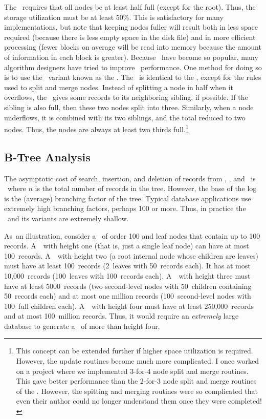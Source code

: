 The \BPtree\ requires that all nodes be at least half full
(except for the root).
Thus, the storage utilization must be at least 50\%.
This is satisfactory for many implementations, but note that keeping
nodes fuller will result both in
less space required (because there is less empty space in the disk file)
and in more efficient processing (fewer blocks on average will be read
into memory because the amount of information in each block is greater).
Because \Btrees\ have become so popular, many algorithm designers have
tried to improve \Btree\ performance.
One method for doing so is to use the \BPtree\ variant known as the
\BStree.
The \BStree\ is identical to the \BPtree, except for the rules used
to split and merge nodes.
Instead of splitting a node in half when it overflows, the \BStree\
gives some records to its neighboring sibling, if possible.
If the sibling is also full, then these two nodes split into three.
Similarly, when a node underflows, it is combined with its two
siblings, and the total reduced to two nodes.
Thus, the nodes are always at least two thirds full.\footnote{
This concept can be extended further if higher space utilization is
required.
However, the update routines become much more complicated.
I once worked on a project where we implemented 3-for-4 node split
and merge routines.
This gave better performance than the 2-for-3 node split and merge
routines of the \BStree.
However, the spitting and merging routines were so complicated that
even their author could no longer understand them
once they were completed!}

\subsection{B-Tree Analysis}

The asymptotic cost of search, insertion, and deletion of
records from \Btrees, \BPtrees, and \BStrees\ is \Thetalogn\
where \(n\) is the total number of records in the tree.
However, the base of the log is the (average) branching factor of the
tree.
Typical database applications use extremely high branching factors,
perhaps 100 or more.
Thus, in practice the \Btree\ and its variants are extremely shallow.

As~an illustration, consider a \BPtree\ of order 100 and leaf
nodes that contain up to 100 records.
A~\BPtree\ with height one (that is, just a single leaf node) can have
at most 100~records.
A~\BPtree\ with height two (a root internal node whose children are
leaves) must have at least 100~records
(2~leaves with 50~records each).
It has at most 10,000~records (100~leaves with 100~records each).
A~\BPtree\ with height three must have at least 5000~records
(two second-level nodes with 50~children containing 50~records each)
and at most one million records (100~second-level nodes with 100~full
children each).
A~\BPtree\ with height four must have at least 250,000~records and at
most 100~million records.
Thus, it would require an \emph{extremely} large database to generate
a \BPtree\ of more than height four.

